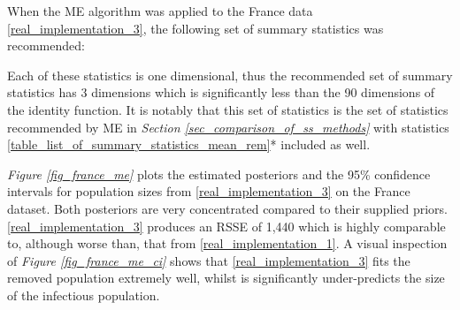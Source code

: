 \documentclass[11pt,a4paper]{article}
\theoremstyle{break}
\begin{document}
  When the ME algorithm was applied to the France data \noindent\ref{real_implementation_3}, the following set of summary statistics was recommended:

  \begin{center}
  \end{center}
  \noindent Each of these statistics is one dimensional, thus the recommended set of summary statistics has 3 dimensions which is significantly less than the 90 dimensions of the identity function. It is notably that this set of statistics is the set of statistics recommended by ME in \textit{Section \ref{sec_comparison_of_ss_methods}} with statistics \ref{table_list_of_summary_statistics_mean_rem}* included as well.

  \par \textit{Figure \ref{fig_france_me}} plots the estimated posteriors and the 95\% confidence intervals for population sizes from \ref{real_implementation_3} on the France dataset. Both posteriors are very concentrated compared to their supplied priors. \ref{real_implementation_3} produces an RSSE of 1,440 which is highly comparable to, although worse than, that from \ref{real_implementation_1}. A visual inspection of \textit{Figure \ref{fig_france_me_ci}} shows that \ref{real_implementation_3} fits the removed population extremely well, whilst is significantly under-predicts the size of the infectious population.
\end{document}
